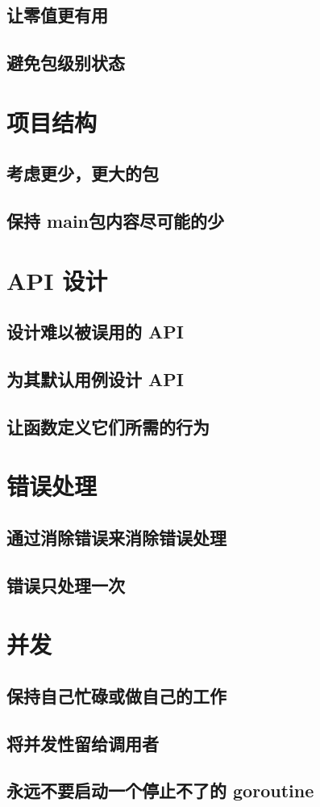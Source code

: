 \documentclass{paper}
\begin{document}
\subsection{让零值更有用}
\subsection{避免包级别状态}

\section{项目结构}

\subsection{考虑更少，更大的包}
\subsection{保持 main包内容尽可能的少}

\section{API 设计}

\subsection{设计难以被误用的 API}
\subsection{为其默认用例设计 API}
\subsection{让函数定义它们所需的行为}

\section{错误处理}

\subsection{通过消除错误来消除错误处理}
\subsection{错误只处理一次}

\section{并发}
\subsection{保持自己忙碌或做自己的工作}
\subsection{将并发性留给调用者}
\subsection{永远不要启动一个停止不了的 goroutine}
\end{document}
